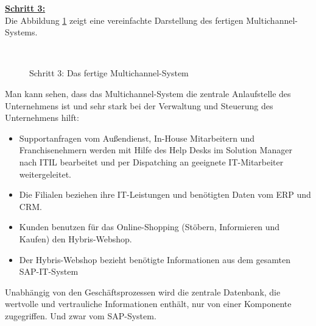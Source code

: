 \textbf{\underline{Schritt 3:}}\\
Die Abbildung \ref{img:Multichannel_fertig} zeigt eine vereinfachte Darstellung des fertigen Multichannel-Systems.
\begin{figure}[H]
\centering
\begin{minipage}[t]{0.9\textwidth}
{\centering{}\\}
\caption{Schritt 3: Das fertige Multichannel-System} %
\label{img:Multichannel_fertig}
\end{minipage}
\end{figure}

Man kann sehen, dass das Multichannel-System die zentrale Anlaufstelle des Unternehmens ist und sehr stark bei der Verwaltung und Steuerung des Unternehmens hilft:
\begin{itemize}
\item Supportanfragen vom Außendienst, In-House Mitarbeitern und Franchisenehmern werden mit Hilfe des Help Desks im Solution Manager nach ITIL bearbeitet und per Dispatching an geeignete IT-Mitarbeiter weitergeleitet.
\item Die Filialen beziehen ihre IT-Leistungen und benötigten Daten vom ERP und CRM.
\item Kunden benutzen für das Online-Shopping (Stöbern, Informieren und Kaufen) den Hybris-Webshop.
\item Der Hybris-Webshop bezieht benötigte Informationen aus dem gesamten SAP-IT-System
\end{itemize}
Unabhängig von den Geschäftsprozessen wird die zentrale Datenbank, die wertvolle und vertrauliche Informationen enthält, nur von einer Komponente zugegriffen. Und zwar vom SAP-System.

